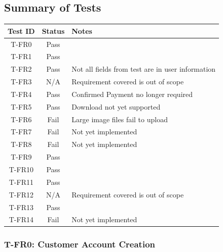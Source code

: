 \documentclass[12pt, titlepage]{article}
\begin{document}
\subsection{Summary of Tests}
\begin{tabular}{|c|c|l|}
    \hline
    \textbf{Test ID} & \textbf{Status} & \textbf{Notes}\\
    \hline
    T-FR0 & Pass & \\
    T-FR1 & Pass & \\
    T-FR2 & Pass & Not all fields from test are in user information\\
    T-FR3 & N/A & Requirement covered is out of scope\\
    T-FR4 & Pass & Confirmed Payment no longer required\\
    T-FR5 & Pass & Download not yet supported\\
    T-FR6 & Fail & Large image files fail to upload\\
    T-FR7 & Fail & Not yet implemented \\ 
    T-FR8 & Fail & Not yet implemented \\ 
    T-FR9 & Pass & \\
    T-FR10 & Pass & \\
    T-FR11 & Pass & \\
    T-FR12 & N/A & Requirement covered is out of scope\\
    T-FR13 & Pass & \\
    T-FR14 & Fail & Not yet implemented \\\hline
\end{tabular}


\subsubsection*{T-FR0: Customer Account Creation}
\end{document}

